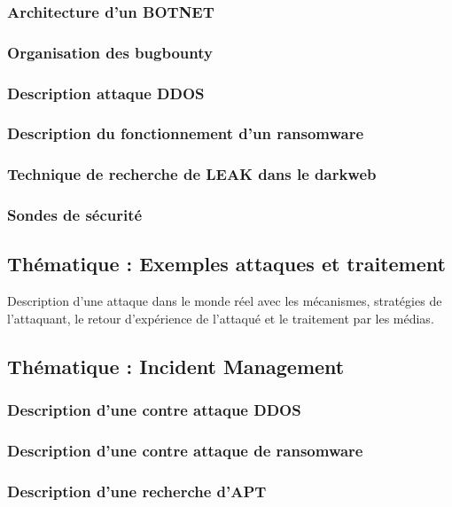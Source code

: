 \subsubsection{Architecture d'un BOTNET}
\subsubsection{Organisation des bugbounty}
\subsubsection{Description attaque DDOS}
\subsubsection{Description du fonctionnement d'un ransomware}
\subsubsection{Technique de recherche de LEAK dans le darkweb}

\subsubsection{Sondes de sécurité}

\subsection{Thématique : Exemples attaques et traitement}
Description d'une attaque dans le monde réel avec les mécanismes, stratégies de l'attaquant, le retour d'expérience de l'attaqué et le traitement par les médias.
\subsection{Thématique : Incident Management}
\subsubsection{Description d'une contre attaque DDOS}
\subsubsection{Description d'une  contre attaque de ransomware} 
\subsubsection{Description d'une recherche d'APT}
